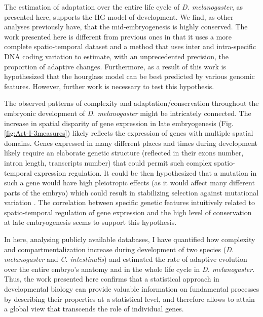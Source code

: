 The estimation of adaptation over the entire life cycle of \textit{D. melanogaster}, as presented here, supports the HG model of development. We find, as other analyses previously have, that the mid-embryogenesis is highly conserved. The work presented here is different from previous ones in that it uses a more complete spatio-temporal dataset and a method that uses inter and intra-specific DNA coding variation to estimate, with an unprecedented precision, the proportion of adaptive changes.
Furthermore, as a result of this work is hypothesized that the hourglass model can be best predicted by various genomic features. However, further work is necessary to test this hypothesis.

The observed patterns of complexity and adaptation/conservation throughout the embryonic development of \textit{D. melanogaster} might be intricately connected.
%
The increase in spatial disparity of gene expression in late embryogenesis (Fig. \ref{fig:Art-I-3measures}) likely reflects the expression of genes with multiple spatial domains.
%
Genes expressed in many different places and times during development likely require an elaborate genetic structure (reflected in their exons number, intron length, transcripts number) that could permit such complex spatio-temporal expression regulation.
%
It could be then hypothesized that a mutation in such a gene would have high pleiotropic effects (as it would affect many different parts of the embryo) which could result in stabilizing selection against mutational variation \citep{Raff1996,Galis2002}.
The correlation between specific genetic features intuitively related to spatio-temporal regulation of gene expression and the high level of conservation at late embryogenesis seems to support this hypothesis. 

%

In here, analysing publicly available databases, I have quantified how complexity and compartmentalization increase during development of two species (\textit{D. melanogaster} and \textit{C. intestinalis}) and estimated the rate of adaptive evolution over the entire embryo's anatomy and in the whole life cycle in \textit{D. melanogaster}.
Thus, the work presented here confirms that a statistical approach in developmental biology can provide valuable information on fundamental processes by describing their properties at a statistical level, and therefore allows to attain a global view that transcends the role of individual genes.

